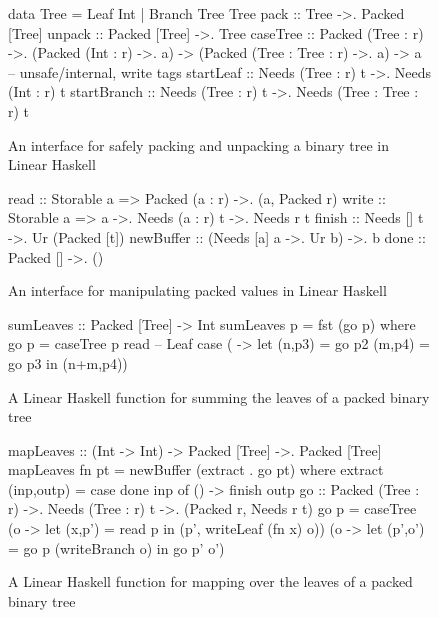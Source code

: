 \begin{figure}
\begin{code}
data Tree = Leaf Int | Branch Tree Tree
pack :: Tree ->. Packed [Tree]
unpack :: Packed [Tree] ->. Tree
caseTree :: Packed (Tree : r) ->.
            (Packed (Int : r) ->. a) ->
            (Packed (Tree : Tree : r) ->. a) -> a
-- unsafe/internal, write tags
startLeaf :: Needs (Tree : r) t ->. Needs (Int : r) t
startBranch :: Needs (Tree : r) t ->. Needs (Tree : Tree : r) t
\end{code}
\caption{An interface for safely packing and unpacking a binary tree
  in Linear Haskell}
\label{fig:linpacktree}
\end{figure}
\begin{figure}
\begin{code}
read :: Storable a => Packed (a : r) ->. (a, Packed r)
write :: Storable a => a ->. Needs (a : r) t ->. Needs r t
finish :: Needs [] t ->. Ur (Packed [t])
newBuffer :: (Needs [a] a ->. Ur b) ->. b
done :: Packed [] ->. ()
\end{code}
\caption{An interface for manipulating packed values in Linear Haskell}
\label{fig:lininterface}
\end{figure}
\begin{figure}
\begin{code}
sumLeaves :: Packed [Tree] -> Int
sumLeaves p = fst (go p)
  where go p = caseTree p
           read -- Leaf case
           ( -> let (n,p3) = go p2
                       (m,p4) = go p3
                   in (n+m,p4))
\end{code}
\caption{A Linear Haskell function for summing the leaves of a packed
  binary tree}
\label{fig:linsumleaves}
\end{figure}
\begin{figure}
\begin{code}
mapLeaves :: (Int -> Int) -> Packed [Tree] ->. Packed [Tree]
mapLeaves fn pt = newBuffer (extract . go pt)
  where
    extract (inp,outp) = case done inp of () -> finish outp
    go :: Packed (Tree : r) ->. Needs (Tree : r) t ->.
          (Packed r, Needs r t)
    go p = caseTree (\p o -> let (x,p') = read p
                             in (p', writeLeaf (fn x) o))
                    (\p o -> let (p',o') = go p (writeBranch o)
                             in go p' o')
\end{code}
\caption{A Linear Haskell function for mapping over the leaves of a packed
  binary tree}
\label{fig:linsumleaves}
\end{figure}


